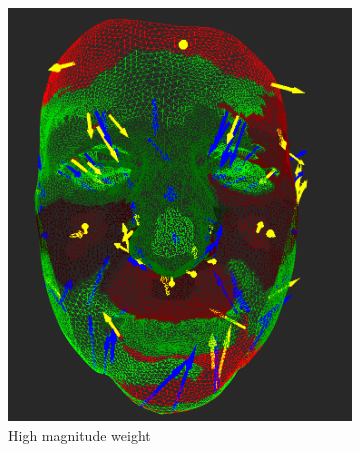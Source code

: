 \begin{figure}[h]
    \begin{subfigure}{0.3\textwidth}
	\includegraphics[width=\textwidth]{./img/meshdiff-high_magnitude.PNG}
	\caption{High magnitude weight}
	\label{fig:meshdiff_high_magnitude}
	\end{subfigure}
    \qquad
    \begin{subfigure}{0.3\textwidth}

\end{subfigure}
\end{figure}
